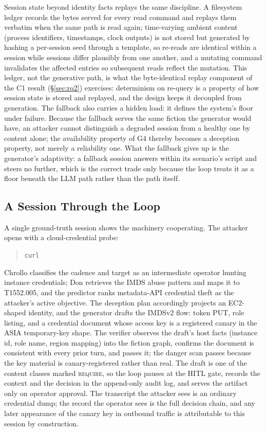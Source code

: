 Session state beyond identity facts replays the same discipline. A
filesystem ledger records the bytes served for every read command and
replays them verbatim when the same path is read again; time-varying
ambient content (process identifiers, timestamps, clock outputs) is not
stored but generated by hashing a per-session seed through a template,
so re-reads are identical within a session while sessions differ
plausibly from one another, and a mutating command invalidates the
affected entries so subsequent reads reflect the mutation. This ledger,
not the generative path, is what the byte-identical replay component of
the C1 result (\S\ref{sec:rq2}) exercises: determinism on re-query is a
property of how session state is stored and replayed, and the design
keeps it decoupled from generation.
The fallback also carries a hidden load: it defines the system's floor
under failure. Because the fallback serves the same fiction the generator
would have, an attacker cannot distinguish a degraded session from a
healthy one by content alone; the availability
property of G4 thereby becomes a deception property, not merely a reliability one.
What the fallback gives up is the generator's adaptivity: a fallback
session answers within its scenario's script and steers no further,
which is the correct trade only because the loop treats it as a floor
beneath the LLM path rather than the path itself.

\subsection{A Session Through the Loop}
\label{sec:example}
A single ground-truth session shows the machinery cooperating. The
attacker opens with a cloud-credential probe:
\begin{quote}\small
\texttt{curl~}
\end{quote}
Chrollo classifies the cadence and target as an intermediate operator
hunting instance credentials; Don retrieves the IMDS abuse pattern and
maps it to \attck T1552.005, and the predictor ranks metadata-API
credential theft as the attacker's active objective. The deception plan
accordingly projects an EC2-shaped identity, and the generator drafts the
IMDSv2 flow: token PUT, role listing, and a credential document whose
access key is a registered canary in the ASIA temporary-key shape. The
verifier observes the draft's host facts (instance id, role name, region
mapping) into the fiction graph, confirms the document is consistent with
every prior turn, and passes it; the danger scan passes because the
key material is canary-registered rather than real. The draft is one of
the content classes marked \textsc{require}, so the loop pauses at the
HITL gate, records the context and the decision in the append-only audit
log, and serves the artifact only on operator approval. The transcript
the attacker sees is an ordinary credential dump; the record the operator
sees is the full decision chain, and any later appearance of the canary
key in outbound traffic is attributable to this session by construction.

